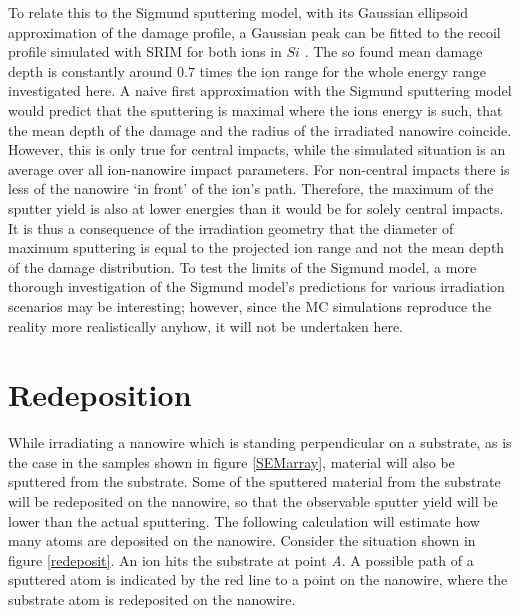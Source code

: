To relate this to the Sigmund sputtering model, with its Gaussian ellipsoid approximation of the damage profile, a Gaussian peak can be fitted to the recoil profile simulated with SRIM for both ions in $Si$ \cite{bobes_ion_2012}. The so found mean damage depth is constantly around $0.7$ times the ion range for the whole energy range investigated here. A naive first approximation with the Sigmund sputtering model would predict that the sputtering is maximal where the ions energy is such, that the mean depth of the damage and the radius of the irradiated nanowire coincide. However, this is only true for central impacts, while the simulated situation is an average over all ion-nanowire impact parameters. For non-central impacts there is less of the nanowire `in front' of the ion's path. Therefore, the maximum of the sputter yield is also at lower energies than it would be for solely central impacts. It is thus a consequence of the irradiation geometry that the diameter of maximum sputtering is equal to the projected ion range and not the mean depth of the damage distribution. To test the limits of the Sigmund model, a more thorough investigation of the Sigmund model's predictions for various irradiation scenarios may be interesting; however, since the MC simulations reproduce the reality more realistically anyhow, it will not be undertaken here.


\vfill
\section{Redeposition}
\label{sec:redeposition}

While irradiating a nanowire which is standing perpendicular on a substrate, as is the case in the samples shown in figure \ref{SEMarray}, material will also be sputtered from the substrate. Some of the sputtered material from the substrate will be redeposited on the nanowire, so that the observable sputter yield will be lower than the actual sputtering. The following calculation will estimate how many atoms are deposited on the nanowire. Consider the situation shown in figure \ref{redeposit}. An ion hits the substrate at point \emph{A}. A possible path of a sputtered atom is indicated by the red line to a point on the nanowire, where the substrate atom is redeposited on the nanowire. 

